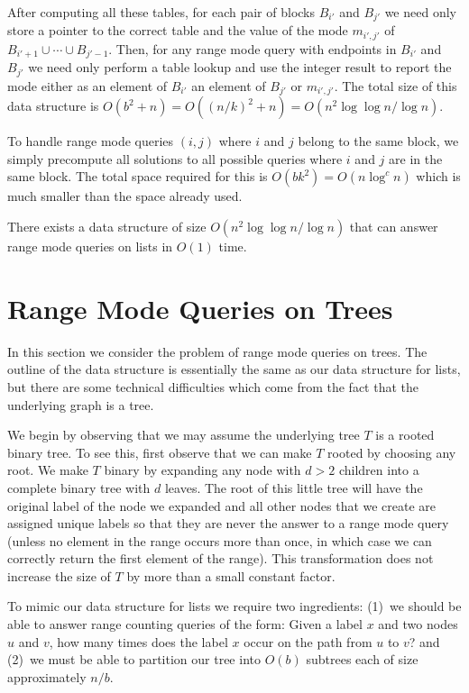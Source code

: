 \documentclass{njcarticle}
\begin{document}
After computing all these tables, for each pair of blocks $B_{i'}$ and
$B_{j'}$ we need only store a pointer to the correct table and the
value of the mode $m_{i',j'}$ of $B_{i'+1}\cup\cdots\cup B_{j'-1}$.
Then, for any range mode query with endpoints in $B_{i'}$ and $B_{j'}$
we need only perform a table lookup and use the integer result to
report the mode either as an element of $B_{i'}$ an element of
$B_{j'}$ or $m_{i',j'}$.  The total size of this data structure is
$O(b^2+n)=O((n/k)^2+n)=O(n^2\log\log n/\log n)$.

To handle range mode queries $(i,j)$ where $i$ and $j$ belong to the
same block, we simply precompute all solutions to all possible queries
where $i$ and $j$ are in the same block.  The total space required for
this is $O(bk^2)=O(n\log^c n)$ which is much smaller than the space
already used.

\begin{theorem}
There exists a data structure of size $O(n^2\log\log n/\log n)$ that can answer
range mode queries on lists in $O(1)$ time.
\end{theorem}


\section{Range Mode Queries on Trees}

In this section we consider the problem of range mode queries on
trees.  The outline of the data structure is essentially the same as
our data structure for lists, but there are some technical
difficulties which come from the fact that the underlying graph is a
tree.  

We begin by observing that we may assume the underlying tree $T$ is a
rooted binary tree.  To see this, first observe that we can make $T$
rooted by choosing any root.  We make $T$ binary by expanding any node
with $d>2$ children into a complete binary tree with $d$ leaves.  The
root of this little tree will have the original label of the node we
expanded and all other nodes that we create are assigned unique labels
so that they are never the answer to a range mode query (unless no
element in the range occurs more than once, in which case we can
correctly return the first element of the range).  This transformation
does not increase the size of $T$ by more than a small constant
factor.

To mimic our data structure for lists we require two ingredients:
(1)~we should be able to answer range counting queries of the form:
Given a label $x$ and two nodes $u$ and $v$, how many times does the
label $x$ occur on the path from $u$ to $v$? and (2)~we must be able
to partition our tree into $O(b)$ subtrees each of size approximately
$n/b$.  
\end{document}
